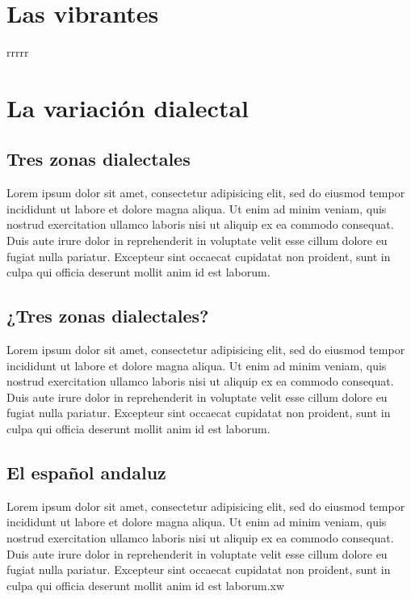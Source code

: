 \documentclass[
]{book}
\begin{document}
\hypertarget{vibrantes}{%
\chapter{Las vibrantes}\label{vibrantes}}

rrrrr

\hypertarget{variacion-dialectal}{%
\chapter{La variación dialectal}\label{variacion-dialectal}}

\hypertarget{tres-zonas-dialectales}{%
\section{Tres zonas dialectales}\label{tres-zonas-dialectales}}

Lorem ipsum dolor sit amet, consectetur adipisicing elit, sed do eiusmod
tempor incididunt ut labore et dolore magna aliqua. Ut enim ad minim veniam,
quis nostrud exercitation ullamco laboris nisi ut aliquip ex ea commodo
consequat. Duis aute irure dolor in reprehenderit in voluptate velit esse
cillum dolore eu fugiat nulla pariatur. Excepteur sint occaecat cupidatat non
proident, sunt in culpa qui officia deserunt mollit anim id est laborum.

\hypertarget{tres-zonas-dialectales-1}{%
\section{¿Tres zonas dialectales?}\label{tres-zonas-dialectales-1}}

Lorem ipsum dolor sit amet, consectetur adipisicing elit, sed do eiusmod
tempor incididunt ut labore et dolore magna aliqua. Ut enim ad minim veniam,
quis nostrud exercitation ullamco laboris nisi ut aliquip ex ea commodo
consequat. Duis aute irure dolor in reprehenderit in voluptate velit esse
cillum dolore eu fugiat nulla pariatur. Excepteur sint occaecat cupidatat non
proident, sunt in culpa qui officia deserunt mollit anim id est laborum.

\hypertarget{el-espauxf1ol-andaluz}{%
\section{El español andaluz}\label{el-espauxf1ol-andaluz}}

Lorem ipsum dolor sit amet, consectetur adipisicing elit, sed do eiusmod
tempor incididunt ut labore et dolore magna aliqua. Ut enim ad minim veniam,
quis nostrud exercitation ullamco laboris nisi ut aliquip ex ea commodo
consequat. Duis aute irure dolor in reprehenderit in voluptate velit esse
cillum dolore eu fugiat nulla pariatur. Excepteur sint occaecat cupidatat non
proident, sunt in culpa qui officia deserunt mollit anim id est laborum.xw

  

\printindex
\end{document}
